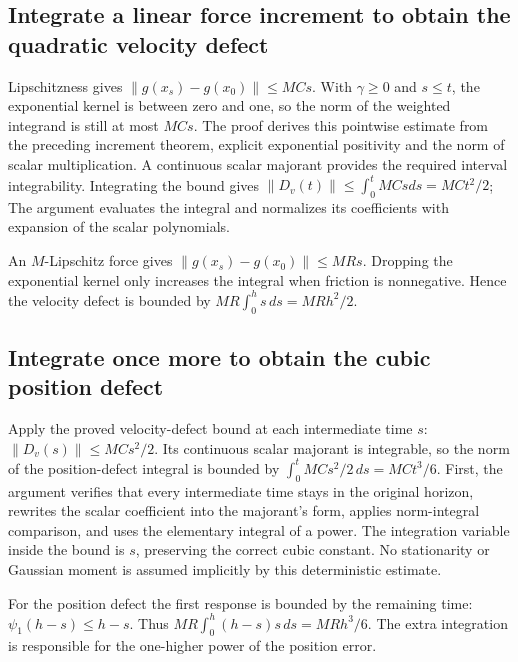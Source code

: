\documentclass[11pt,a4paper]{report}
\begin{document}
\subsection{\texorpdfstring{Integrate a linear force increment to obtain the quadratic velocity defect}{Integrate a linear force increment to obtain the quadratic velocity defect}}
\label{report-step-KineticLangevin-LocalError-lean-3}


Lipschitzness gives \(\|g(x_s)-g(x_0)\|\le MCs\). With \(\gamma\ge0\) and \(s\le t\), the exponential kernel is between zero and one, so the norm of the weighted integrand is still at most \(MCs\). The proof derives this pointwise estimate from the preceding increment theorem, explicit exponential positivity and the norm of scalar multiplication. A continuous scalar majorant provides the required interval integrability. Integrating the bound gives \(\|D_v(t)\|\le\int_0^tMCsds=MCt^2/2\); The argument evaluates the integral and normalizes its coefficients with expansion of the scalar polynomials.



An \(M\)-Lipschitz force gives \(\|g(x_s)-g(x_0)\|\le MRs\). Dropping the exponential kernel only increases the integral when friction is nonnegative. Hence the velocity defect is bounded by \(MR\int_0^h s\,ds=MRh^2/2\).

\subsection{\texorpdfstring{Integrate once more to obtain the cubic position defect}{Integrate once more to obtain the cubic position defect}}
\label{report-step-KineticLangevin-LocalError-lean-4}


Apply the proved velocity-defect bound at each intermediate time \(s\): \(\|D_v(s)\|\le MCs^2/2\). Its continuous scalar majorant is integrable, so the norm of the position-defect integral is bounded by \(\int_0^tMCs^2/2\,ds=MCt^3/6\). First, the argument verifies that every intermediate time stays in the original horizon, rewrites the scalar coefficient into the majorant's form, applies norm-integral comparison, and uses the elementary integral of a power. The integration variable inside the bound is \(s\), preserving the correct cubic constant. No stationarity or Gaussian moment is assumed implicitly by this deterministic estimate.



For the position defect the first response is bounded by the remaining time: \(\psi_1(h-s)\le h-s\). Thus \(MR\int_0^h(h-s)s\,ds=MRh^3/6\). The extra integration is responsible for the one-higher power of the position error.
\end{document}
